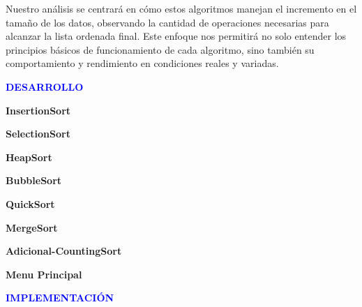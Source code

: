 \documentclass[12pt]{article}
\begin{document}
    \par\vspace{0.4cm}
    Nuestro análisis se centrará en cómo estos algoritmos manejan el incremento en el tamaño de los datos, observando la cantidad de operaciones necesarias para alcanzar la lista ordenada final. Este enfoque nos permitirá no solo entender los principios básicos de funcionamiento de cada algoritmo, sino también su comportamiento y rendimiento en condiciones reales y variadas.
    \par\vspace{1.5cm}
    \textcolor{blue}{\textbf{DESARROLLO}}
    \par\vspace{0.4cm}
    \textcolor[rgb]{0.13, 0.55, 0.13}{\textbf{InsertionSort}}
    \par\vspace{0.4cm}

    \textcolor[rgb]{0.13, 0.55, 0.13}{\textbf{SelectionSort}}
    \par\vspace{0.4cm}

    \textcolor[rgb]{0.13, 0.55, 0.13}{\textbf{HeapSort}}
    \par\vspace{0.4cm}

    \textcolor[rgb]{0.13, 0.55, 0.13}{\textbf{BubbleSort}}
    \par\vspace{0.4cm}

    \textcolor[rgb]{0.13, 0.55, 0.13}{\textbf{QuickSort}}
    \par\vspace{0.4cm}

    \textcolor[rgb]{0.13, 0.55, 0.13}{\textbf{MergeSort}}
    \par\vspace{0.4cm}

    \textcolor[rgb]{0.13, 0.55, 0.13}{\textbf{Adicional-CountingSort}}
    \par\vspace{0.4cm}

    \textcolor[rgb]{0.13, 0.55, 0.13}{\textbf{Menu Principal}}
    \par\vspace{0.4cm}
    \par\vspace{0.4cm}


    \textcolor{blue}{\textbf{IMPLEMENTACIÓN}}
    \par\vspace{0.4cm}
\end{document}
